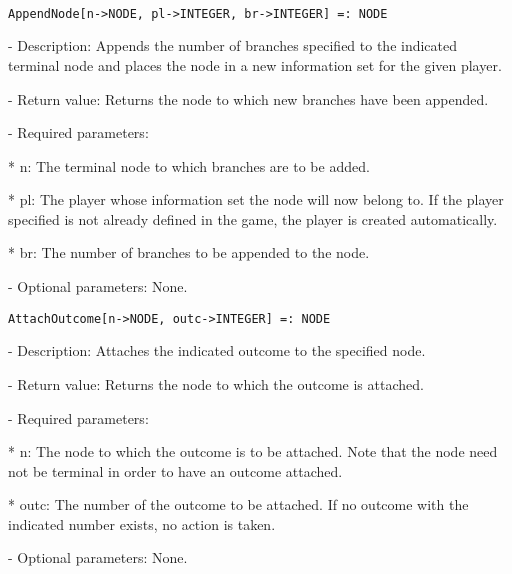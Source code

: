 \begin{itemize}

\item
\begin{verbatim}

AppendNode[n->NODE, pl->INTEGER, br->INTEGER] =: NODE

\end{verbatim}

\begin{description}
\item
- Description:  Appends the number of branches specified to the
indicated terminal node and places the node in a new information set
for the given player.
\item
- Return value: Returns the node to which new branches have been appended.
\item
- Required parameters:
\begin{description}
\item
*  n:  The terminal node to which branches are to be added.
\item
*  pl:  The player whose information set the node will now belong to.
If the player specified is not already defined in the game, the player
is created automatically. 
\item
*  br:  The number of branches to be appended to the node.
\end{description}
\item
- Optional parameters:  None.
\end{description}

\item
\begin{verbatim}
AttachOutcome[n->NODE, outc->INTEGER] =: NODE
\end{verbatim}
\begin{description}
\item
- Description:  Attaches the indicated outcome to the specified node.
\item
- Return value:  Returns the node to which the outcome is attached.
\item
- Required parameters:
\begin{description}
\item
*  n:  The node to which the outcome is to be attached.  Note that the
node need not be terminal in order to have an outcome attached.
\item
*  outc:  The number of the outcome to be attached.  If no outcome
with the indicated number exists, no action is taken.  
\end{description}
\item
- Optional parameters:  None.
\end{description}

\end{itemize}

